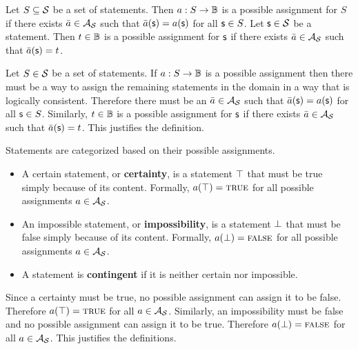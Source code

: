 \begin{mathSection}
	
	\begin{defn}
		Let $S \subseteq \mathcal{S}$ be a set of statements. Then $a : S \to \mathbb{B}$ is a possible assignment for $S$ if there exists $\bar{a} \in \mathcal{A}_{\mathcal{S}}$ such that $\bar{a}(\mathsf{s}) = a(\mathsf{s})$ for all $\mathsf{s} \in S$. Let $\mathsf{s} \in \mathcal{S}$ be a statement. Then $t \in \mathbb{B}$ is a possible assignment for $\mathsf{s}$ if there exists $\bar{a} \in \mathcal{A}_{\mathcal{S}}$ such that $\bar{a}(\mathsf{s}) = t$.
	\end{defn}
	
	\begin{justification}
		Let $S \in \mathcal{S}$ be a set of statements. If $a : S \to \mathbb{B}$ is a possible assignment then there must be a way to assign the remaining statements in the domain in a way that is logically consistent. Therefore there must be an $\bar{a} \in \mathcal{A}_{\mathcal{S}}$ such that $\bar{a}(\mathsf{s}) = a(\mathsf{s})$ for all $\mathsf{s} \in S$. Similarly, $t \in \mathbb{B}$ is a possible assignment for $\mathsf{s}$ if there exists $\bar{a} \in \mathcal{A}_{\mathcal{S}}$ such that $\bar{a}(\mathsf{s}) = t$. This justifies the definition.
	\end{justification}
	
	\begin{defn}
		Statements are categorized based on their possible assignments.
		
		\begin{itemize}
			\item A certain statement, or \textbf{certainty}, is a statement $\top$ that must be true simply because of its content. Formally, $a(\top) = \textup{\textsc{true}}$ for all possible assignments $a \in \mathcal{A}_{\mathcal{S}}$.
			\item An impossible statement, or \textbf{impossibility}, is a statement $\bot$ that must be false simply because of its content. Formally, $a(\bot) = \textup{\textsc{false}}$ for all possible assignments $a \in \mathcal{A}_{\mathcal{S}}$.
			\item A statement is \textbf{contingent} if it is neither certain nor impossible.
		\end{itemize}
		
	\end{defn}
	
	\begin{justification}
		Since a certainty must be true, no possible assignment can assign it to be false. Therefore $a(\top) = \textup{\textsc{true}}$ for all $a \in \mathcal{A}_{\mathcal{S}}$. Similarly, an impossibility must be false and no possible assignment can assign it to be true. Therefore $a(\bot) = \textup{\textsc{false}}$ for all $a \in \mathcal{A}_{\mathcal{S}}$. This justifies the definitions.
	\end{justification}
	

\end{mathSection}
